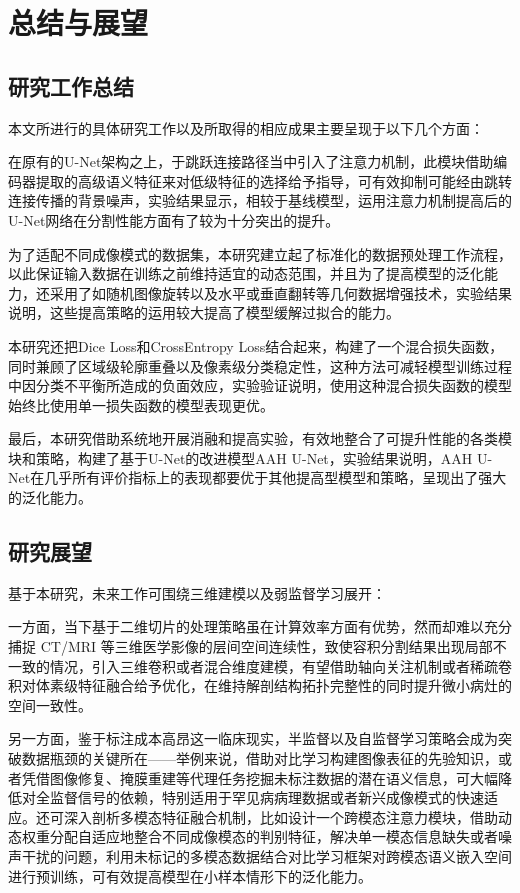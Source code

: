 \section{总结与展望}

\subsection{研究工作总结}
本文所进行的具体研究工作以及所取得的相应成果主要呈现于以下几个方面：

在原有的U-Net架构之上，于跳跃连接路径当中引入了注意力机制，此模块借助编码器提取的高级语义特征来对低级特征的选择给予指导，可有效抑制可能经由跳转连接传播的背景噪声，实验结果显示，相较于基线模型，运用注意力机制提高后的U-Net网络在分割性能方面有了较为十分突出的提升。

为了适配不同成像模式的数据集，本研究建立起了标准化的数据预处理工作流程，以此保证输入数据在训练之前维持适宜的动态范围，并且为了提高模型的泛化能力，还采用了如随机图像旋转以及水平或垂直翻转等几何数据增强技术，实验结果说明，这些提高策略的运用较大提高了模型缓解过拟合的能力。

本研究还把Dice Loss和CrossEntropy Loss结合起来，构建了一个混合损失函数，同时兼顾了区域级轮廓重叠以及像素级分类稳定性，这种方法可减轻模型训练过程中因分类不平衡所造成的负面效应，实验验证说明，使用这种混合损失函数的模型始终比使用单一损失函数的模型表现更优。

最后，本研究借助系统地开展消融和提高实验，有效地整合了可提升性能的各类模块和策略，构建了基于U-Net的改进模型AAH U-Net，实验结果说明，AAH U-Net在几乎所有评价指标上的表现都要优于其他提高型模型和策略，呈现出了强大的泛化能力。


\subsection{研究展望}

基于本研究，未来工作可围绕三维建模以及弱监督学习展开：

一方面，当下基于二维切片的处理策略虽在计算效率方面有优势，然而却难以充分捕捉 CT/MRI 等三维医学影像的层间空间连续性，致使容积分割结果出现局部不一致的情况，引入三维卷积或者混合维度建模，有望借助轴向关注机制或者稀疏卷积对体素级特征融合给予优化，在维持解剖结构拓扑完整性的同时提升微小病灶的空间一致性。

另一方面，鉴于标注成本高昂这一临床现实，半监督以及自监督学习策略会成为突破数据瓶颈的关键所在——举例来说，借助对比学习构建图像表征的先验知识，或者凭借图像修复、掩膜重建等代理任务挖掘未标注数据的潜在语义信息，可大幅降低对全监督信号的依赖，特别适用于罕见病病理数据或者新兴成像模式的快速适应。还可深入剖析多模态特征融合机制，比如设计一个跨模态注意力模块，借助动态权重分配自适应地整合不同成像模态的判别特征，解决单一模态信息缺失或者噪声干扰的问题，利用未标记的多模态数据结合对比学习框架对跨模态语义嵌入空间进行预训练，可有效提高模型在小样本情形下的泛化能力。